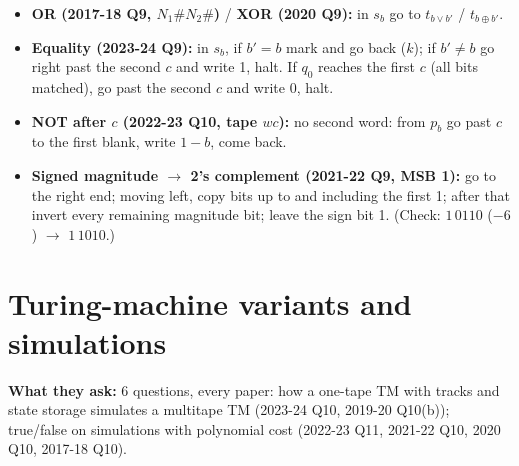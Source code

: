 \documentclass[10.5pt,a4paper]{article}
\newcommand{\asked}[1]{{\small\color{gray!60!black}\textbf{What they ask:} #1}\par}
\begin{document}
\begin{recipe}
\begin{itemize}
\item \textbf{OR (2017-18 Q9, $N_1\#N_2\#$)} / \textbf{XOR (2020 Q9):} in $s_b$ go to $t_{b\vee b'}$ / $t_{b\oplus b'}$.
\item \textbf{Equality (2023-24 Q9):} in $s_b$, if $b'=b$ mark and go back ($k$); if $b'\ne b$ go right past the second $c$ and write 1, halt.
If $q_0$ reaches the first $c$ (all bits matched), go past the second $c$ and write 0, halt.
\item \textbf{NOT after $c$ (2022-23 Q10, tape $wc$):} no second word: from $p_b$ go past $c$ to the first blank, write $1-b$, come back.
\item \textbf{Signed magnitude $\to$ 2's complement (2021-22 Q9, MSB 1):} go to the right end; moving left, copy bits up to and including the
first 1; after that invert every remaining magnitude bit; leave the sign bit 1. (Check: $1\,0110$ ($-6$) $\to$ $1\,1010$.)
\end{itemize}
\end{recipe}

\section{Turing-machine variants and simulations}
\asked{6 questions, every paper: how a one-tape TM with tracks and state storage simulates a multitape TM (2023-24 Q10, 2019-20 Q10(b)); true/false
on simulations with polynomial cost (2022-23 Q11, 2021-22 Q10, 2020 Q10, 2017-18 Q10).}
\end{document}
